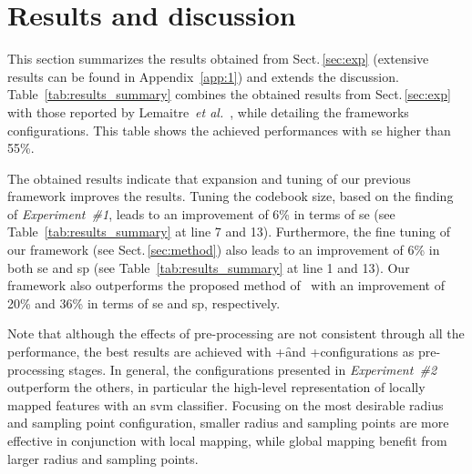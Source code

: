 
\section{Results and discussion}
\label{sec:res-dis}
This section summarizes the results obtained from Sect.\,\ref{sec:exp} (extensive results can be found in Appendix~\ref{app:1}) and extends the discussion.
Table~\ref{tab:results_summary} combines the obtained results from Sect.\,\ref{sec:exp} with those reported by Lemaitre~\emph{et al.}~\cite{Lemaintre2015miccaiOCT}, while detailing the frameworks configurations.
This table shows the achieved performances with \ac{se} higher than 55\%.

The obtained results indicate that expansion and tuning of our previous framework improves the results.
Tuning the codebook size, based on the finding of \emph{Experiment~\#1}, leads to an improvement of 6\% in terms of \ac{se} (see Table~\ref{tab:results_summary} at line 7 and 13).
Furthermore, the fine tuning of our framework (see Sect.\,\ref{sec:method}) also leads to an improvement of 6\% in both \ac{se} and \ac{sp} (see Table~\ref{tab:results_summary} at line 1 and 13).
Our framework also outperforms the proposed method of~\cite{Venhuizen2015} with an improvement of 20\% and 36\% in terms of \ac{se} and \ac{sp}, respectively.

Note that although the effects of pre-processing are not consistent through all the performance, the best results are achieved with \nlm+\f and \nlm+\fal configurations as pre-processing stages.
In general, the configurations presented in \emph{Experiment~\#2} outperform the others, in particular the high-level representation of locally mapped features with an \ac{svm} classifier.  
Focusing on the most desirable radius and sampling point configuration, smaller radius and sampling points are more effective in conjunction with local mapping, while global mapping benefit from larger radius and sampling points.

